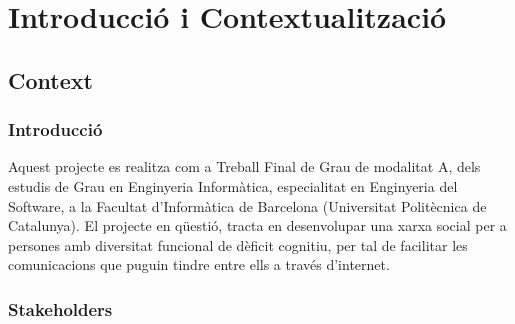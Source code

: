 \documentclass[11pt,catalan,listoffigures,listoftables]{tfgetsinf}
\begin{document}

\mainmatter


\chapter{Introducció i Contextualització}

\section{Context}

\subsection{Introducció}

Aquest projecte es realitza com a Treball Final de Grau de modalitat A, dels estudis de Grau en Enginyeria Informàtica, especialitat en Enginyeria del Software, a la Facultat d’Informàtica de Barcelona (Universitat Politècnica de Catalunya).
El projecte en qüestió, tracta en desenvolupar una xarxa social per a persones amb diversitat funcional de dèficit cognitiu, per tal de facilitar les comunicacions que puguin tindre entre ells a través d’internet.

\subsection{Stakeholders}
\end{document}
